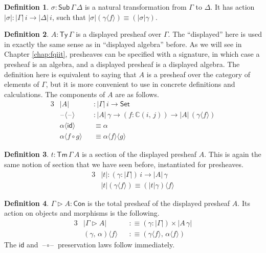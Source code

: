 \documentclass[12pt,a4paper,twoside,openany]{book}
\theoremstyle{remark}
\theoremstyle{definition}
\newtheorem{mydefinition}{Definition}
\theoremstyle{theorem}
\newcommand{\mbb}[1]{\mathbb{#1}}
\newcommand{\id}{\mathsf{id}}
\newcommand{\Con}{\mathsf{Con}}
\newcommand{\Sub}{\mathsf{Sub}}
\newcommand{\Tm}{\mathsf{Tm}}
\newcommand{\Ty}{\mathsf{Ty}}
\newcommand{\blank}{\mathord{\hspace{1pt}\text{--}\hspace{1pt}}}
\newcommand{\Set}{\mathsf{Set}}
\newcommand{\ext}{\triangleright}
\newcommand{\mbbC}{\mbb{C}}
\newcommand{\lab}{\langle}
\newcommand{\rab}{\rangle}
\newcommand{\defn}{:\equiv}
\begin{document}
\begin{mydefinition}
$\sigma : \Sub\,\Gamma\,\Delta$ is a natural transformation from $\Gamma$ to
$\Delta$. It has action $|\sigma| : |\Gamma|\,i \to |\Delta|\,i$, such that
$|\sigma|(\gamma\lab f \rab) \equiv (|\sigma|\gamma)$.
\end{mydefinition}

\begin{mydefinition}
\label{def:presheaf-type}
$A : \Ty\,\Gamma$ is a displayed presheaf over $\Gamma$. The
``displayed'' here is used in exactly the same sense as in ``displayed
algebra'' before. As we will see in Chapter \ref{chap:fqiit}, presheaves can be
specified with a signature, in which case a presheaf is an algebra, and a
displayed presheaf is a displayed algebra. The definition here is equivalent
to saying that $A$ is a presheaf over the category of elements of $\Gamma$,
but it is more convenient to use in concrete definitions and calculations. The
components of $A$ are as follows.
\begin{alignat*}{3}
  &|A| &&: |\Gamma|\,i \to \Set\\
  &\blank\lab\blank\rab &&: |A|\,\gamma \to (f : \mbbC(i,\,j)) \to |A|\,(\gamma\lab f \rab)\\
  & \alpha\lab\id\rab &&\equiv \alpha \\
  & \alpha\lab f\circ g\rab &&\equiv \alpha \lab f \rab \lab g \rab
\end{alignat*}
\end{mydefinition}

\begin{mydefinition}
$t : \Tm\,\Gamma\,A$ is a section of the displayed presheaf $A$. This is
again the same notion of section that we have seen before, instantiated for
presheaves.
\begin{alignat*}{3}
  & |t| : (\gamma : |\Gamma|)\,i \to |A|\,\gamma \\
  & |t|(\gamma\lab f \rab) \equiv (|t|\gamma)\lab f \rab
\end{alignat*}
\end{mydefinition}

\begin{mydefinition}
$\Gamma \ext A : \Con$ is the total presheaf of the displayed presheaf $A$. Its action on objects and morphisms is the following.
\begin{alignat*}{3}
  &|\Gamma \ext A| &&\defn (\gamma : |\Gamma|) \times |A\,\gamma|\\
  &(\gamma,\,\alpha)\lab f \rab &&\defn (\gamma\lab f \rab,\, \alpha\lab f \rab)
\end{alignat*}
The $\id$ and $\blank\!\circ\!\blank$ preservation laws follow immediately.
\end{mydefinition}
\end{document}
